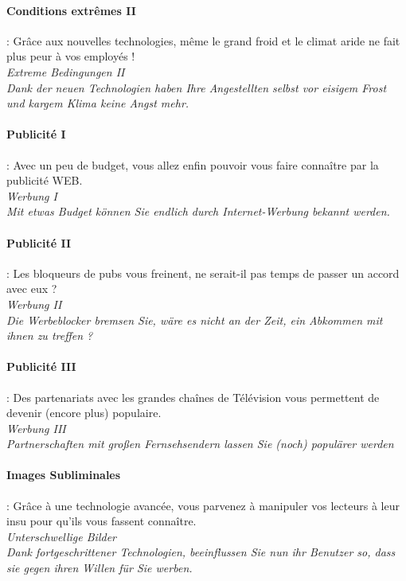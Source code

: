 \documentclass[10pt,a4paper]{article}
\begin{document}
\paragraph{Conditions extrêmes II} : Grâce aux nouvelles technologies, même le grand froid et le climat aride ne fait plus peur à vos employés !\\

\textit{Extreme Bedingungen II}\\
\textit{Dank der neuen Technologien haben Ihre Angestellten selbst vor eisigem Frost und kargem Klima keine Angst mehr.}


\paragraph{Publicité I} : Avec un peu de budget, vous allez enfin pouvoir vous faire connaître par la publicité WEB.\\
\textit{Werbung I}\\
\textit{Mit etwas Budget können Sie endlich durch Internet-Werbung bekannt werden.}


\paragraph{Publicité II} : Les bloqueurs de pubs vous freinent, ne serait-il pas temps de passer un accord avec eux ?\\
\textit{Werbung II}\\
\textit{Die Werbeblocker bremsen Sie, wäre es nicht an der Zeit, ein Abkommen mit ihnen zu treffen ?}


\paragraph{Publicité III} : Des partenariats avec les grandes chaînes de Télévision vous permettent de devenir (encore plus) populaire.\\
\textit{Werbung III}\\
\textit{Partnerschaften mit gro\ss en Fernsehsendern lassen Sie (noch) populärer werden}


\paragraph{Images Subliminales} : Grâce à une technologie avancée, vous parvenez à manipuler vos lecteurs à leur insu pour qu'ils vous fassent connaître.\\
\textit{Unterschwellige Bilder}\\
\textit{Dank fortgeschrittener Technologien, beeinflussen Sie nun ihr Benutzer so, dass sie gegen ihren Willen für Sie werben.}
\end{document}
